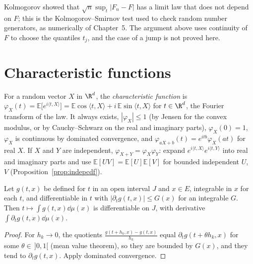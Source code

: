 Kolmogorov showed that $\sqrt n\sup_t|F_n-F|$ has a
limit law that does not depend on $F$; this is the Kolmogorov--Smirnov test used to check random number generators,
as numerically of Chapter~5. The argument above uses continuity of $F$ to choose the quantiles $t_j$, and the case of a jump is not proved here.

\section{Characteristic functions}

For a random vector $X$ in $\R^d$, the \emph{characteristic function} is $\varphi_X(t)=\mathbb E\bigl[e^{i\langle t,X\rangle}\bigr]=\mathbb E\cos\langle t,X\rangle+i\,\mathbb E\sin\langle t,X\rangle$
for $t\in\R^d$, the Fourier transform of the law. It always exists, $|\varphi_X|\le1$ (by Jensen for the convex modulus, or by
Cauchy--Schwarz on the real and imaginary parts), $\varphi_X(0)=1$, $\varphi_X$ is continuous by dominated convergence, and
$\varphi_{aX+b}(t)=e^{itb}\varphi_X(at)$ for real $X$. If $X$ and $Y$ are independent, $\varphi_{X+Y}=\varphi_X\varphi_Y$: expand $e^{i\langle t,X\rangle}e^{i\langle t,Y\rangle}$ into real and
imaginary parts and use $\mathbb E[UV]=\mathbb E[U]\mathbb E[V]$ for bounded independent $U$, $V$ (Proposition~\ref{prop:indepcdf}).

\begin{lemma}\label{lem:diffint}
Let $g(t,x)$ be defined for $t$ in an open interval $J$ and $x\in E$, integrable in $x$ for each $t$, and differentiable in $t$ with
$|\partial_tg(t,x)|\le G(x)$ for an integrable $G$. Then $t\mapsto\int g(t,x)\dd\mu(x)$ is differentiable on $J$, with derivative $\int\partial_tg(t,x)\dd\mu(x)$.
\end{lemma}
\begin{proof}
For $h_k\to0$, the quotients $\frac{g(t+h_k,x)-g(t,x)}{h_k}$ equal $\partial_tg(t+\theta h_k,x)$ for some $\theta\in\,]0,1[$ (mean value theorem), so they are bounded by $G(x)$,
and they tend to $\partial_tg(t,x)$. Apply dominated convergence.
\end{proof}

